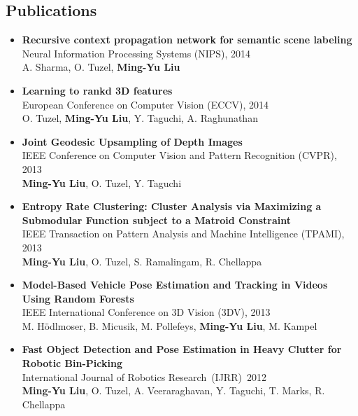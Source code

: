 \documentclass[10pt,letterpaper]{article}
\begin{document}
\subsection*{Publications}
\begin{itemize}
\item           {\bf Recursive context propagation network for semantic scene labeling}\\
                Neural Information Processing Systems (NIPS), 2014\\
                A. Sharma, O. Tuzel, {\bf Ming-Yu Liu}\vspace{-2mm}

\item           {\bf Learning to rankd 3D features}\\
                European Conference on Computer Vision (ECCV), 2014\\
                O. Tuzel, {\bf Ming-Yu Liu}, Y. Taguchi, A. Raghunathan\vspace{-2mm}

\item           {\bf Joint Geodesic Upsampling of Depth Images}\\
                IEEE Conference on Computer Vision and Pattern Recognition (CVPR), 2013\\
                {\bf Ming-Yu Liu}, O. Tuzel, Y. Taguchi\vspace{-2mm}

\item           {\bf Entropy Rate Clustering: Cluster Analysis via Maximizing a Submodular Function subject to a Matroid Constraint}\\
                IEEE Transaction on Pattern Analysis and Machine Intelligence (TPAMI), 2013\\
                {\bf Ming-Yu Liu}, O. Tuzel, S. Ramalingam, R. Chellappa\vspace{-2mm}

\item           {\bf Model-Based Vehicle Pose Estimation and Tracking in Videos Using Random Forests}\\
                IEEE International Conference on 3D Vision (3DV), 2013\\
                M. Hödlmoser, B. Micusik, M. Pollefeys, {\bf Ming-Yu Liu}, M. Kampel\vspace{-2mm}

\item           {\bf Fast Object Detection and Pose Estimation in Heavy Clutter for Robotic Bin-Picking}\\
                International Journal of Robotics Research~(IJRR)~2012\\
                {\bf Ming-Yu Liu}, O. Tuzel, A. Veeraraghavan, Y. Taguchi, T. Marks, R. Chellappa\vspace{-2mm}


\end{itemize}
\end{document}

